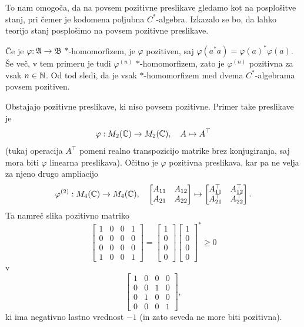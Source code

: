 To nam omogoča, da na povsem pozitivne preslikave gledamo kot na posplošitve stanj,
pri čemer je kodomena poljubna $C^*$-algebra. Izkazalo se bo, da lahko teorijo stanj posplošimo na 
povsem pozitivne preslikave.

\begin{zgled}
    Če je $\varphi: \mathfrak{A} \to \mathfrak{B}$ $*$-homomorfizem, je $\varphi$ pozitiven, saj 
    $\varphi(a^* a) = \varphi(a) ^* \varphi(a)$. Še več, v tem primeru je tudi $\varphi^{(n)}$ $*$-homomorfizem,
    zato je $\varphi^{(n)}$ pozitivna za vsak $n\in \mathbb N$. Od tod sledi,
    da je vsak $*$-homomorfizem med dvema $C^*$-algebrama povsem pozitiven.
\end{zgled}

\begin{zgled}\label{zgl:1.4}
    Obstajajo pozitivne preslikave, ki niso povsem pozitivne.
    Primer take preslikave je $$\varphi: M_2 (\mathbb C) \to M_2 (\mathbb C),\quad A \mapsto A^\top$$
    (tukaj operacija $A^\top$ pomeni realno transpozicijo matrike brez konjugiranja, saj mora biti $\varphi$ linearna preslikava).
    Očitno je $\varphi$ pozitivna preslikava, kar pa ne velja za njeno drugo ampliacijo
    $$\varphi^{(2)}:  M_4 (\mathbb C) \to M_4 (\mathbb C),\quad \begin{bmatrix}
        A_{11} & A_{12}\\
        A_{21} & A_{22}
    \end{bmatrix} \mapsto \begin{bmatrix}
        A_{11}^\top & A_{12}^\top\\
        A_{21}^\top & A_{22}^\top
    \end{bmatrix}.$$ Ta namreč slika pozitivno matriko
    $$\begin{bmatrix}
        1 & 0 & 0 & 1\\
        0 & 0 & 0 & 0\\
        0 & 0 & 0 & 0\\
        1 & 0 & 0 & 1
    \end{bmatrix} = \begin{bmatrix}
        1 \\ 0 \\ 0 \\ 0
    \end{bmatrix} \begin{bmatrix}
        1 \\ 0 \\ 0 \\ 0
    \end{bmatrix}^* \geq 0$$
    v
    $$\begin{bmatrix}
        1 & 0 & 0 & 0\\
        0 & 0 & 1 & 0\\
        0 & 1 & 0 & 0\\
        0 & 0 & 0 & 1
    \end{bmatrix},$$
    ki ima negativno lastno vrednost $-1$ (in zato seveda ne more biti pozitivna).
\end{zgled}

